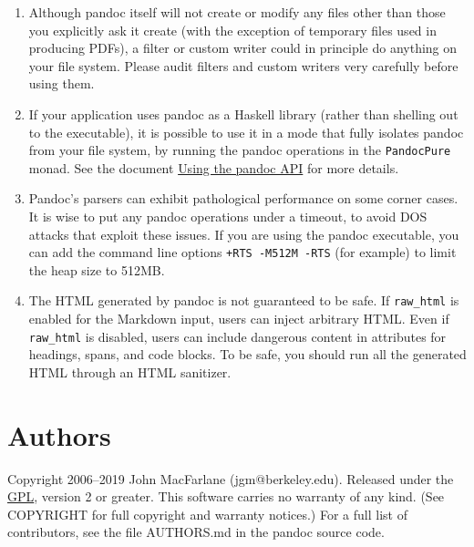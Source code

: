 \begin{enumerate}
\def\labelenumi{\arabic{enumi}.}
\item
  Although pandoc itself will not create or modify any files other than
  those you explicitly ask it create (with the exception of temporary
  files used in producing PDFs), a filter or custom writer could in
  principle do anything on your file system. Please audit filters and
  custom writers very carefully before using them.
\item
  If your application uses pandoc as a Haskell library (rather than
  shelling out to the executable), it is possible to use it in a mode
  that fully isolates pandoc from your file system, by running the
  pandoc operations in the \texttt{PandocPure} monad. See the document
  \href{http://pandoc.org/using-the-pandoc-api.html}{Using the pandoc
  API} for more details.
\item
  Pandoc's parsers can exhibit pathological performance on some corner
  cases. It is wise to put any pandoc operations under a timeout, to
  avoid DOS attacks that exploit these issues. If you are using the
  pandoc executable, you can add the command line options
  \texttt{+RTS\ -M512M\ -RTS} (for example) to limit the heap size to
  512MB.
\item
  The HTML generated by pandoc is not guaranteed to be safe. If
  \texttt{raw\_html} is enabled for the Markdown input, users can inject
  arbitrary HTML. Even if \texttt{raw\_html} is disabled, users can
  include dangerous content in attributes for headings, spans, and code
  blocks. To be safe, you should run all the generated HTML through an
  HTML sanitizer.
\end{enumerate}

\hypertarget{authors}{%
\section{Authors}\label{authors}}

Copyright 2006--2019 John MacFarlane (jgm@berkeley.edu). Released under
the \href{http://www.gnu.org/copyleft/gpl.html}{GPL}, version 2 or
greater. This software carries no warranty of any kind. (See COPYRIGHT
for full copyright and warranty notices.) For a full list of
contributors, see the file AUTHORS.md in the pandoc source code.
